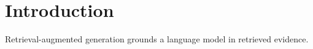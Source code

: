 \documentclass{article}
\begin{document}
\section{Introduction}
Retrieval-augmented generation grounds a language model in retrieved evidence.
\end{document}
